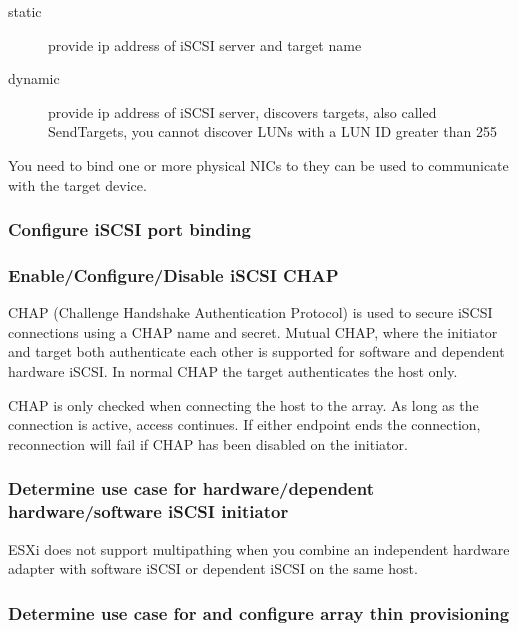 \begin{description}

\item[static]
provide ip address of iSCSI server and target name

\item[dynamic]
provide ip address of iSCSI server, discovers targets, also called SendTargets,
you cannot discover LUNs with a LUN ID greater than 255

\end{description}

You need to bind one or more physical NICs to they can be used to communicate
with the target device.\\

\subsubsection{Configure iSCSI port binding}

\subsubsection{Enable/Configure/Disable iSCSI CHAP}

CHAP (Challenge Handshake Authentication Protocol) is used to secure iSCSI
connections using a CHAP name and secret. Mutual CHAP, where the initiator and
target both authenticate each other is supported for software and dependent
hardware iSCSI. In normal CHAP the target authenticates the host only.

CHAP is only checked when connecting the host to the array. As long as the
connection is active, access continues. If either endpoint ends the
connection, reconnection will fail if CHAP has been disabled on the initiator.

\subsubsection{Determine use case for hardware/dependent hardware/software iSCSI initiator}

ESXi does not support multipathing when you combine an independent hardware
adapter with software iSCSI or dependent iSCSI on the same host.

\subsubsection{Determine use case for and configure array thin provisioning}

